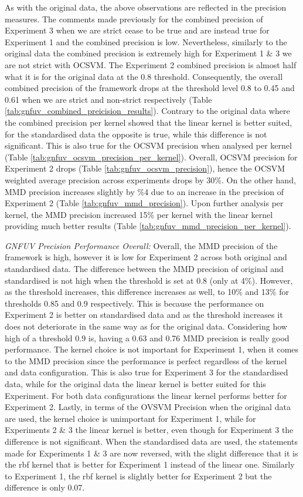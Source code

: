 \documentclass{mpaper}
\begin{document}
As with the original data, the above observations are reflected in the precision measures. The comments made previously for the combined precision of Experiment 3 when we are strict cease to be true and are instead true for Experiment 1 and the combined precision is low. Nevertheless, similarly to the original data the combined precision is extremely high for Experiment 1 \& 3 we are not strict with OCSVM. The Experiment 2 combined precision is almost half what it is for the original data at the 0.8 threshold. Consequently, the overall combined precision of the framework drops at the threshold level 0.8 to 0.45 and 0.61 when we are strict and non-strict respectively (Table \ref{tab:gnfuv_combined_preicision_results}). Contrary to the original data where the combined precision per kernel showed that the linear kernel is better suited, for the standardised data the opposite is true, while this difference is not significant. This is also true for the OCSVM precision when analysed per kernel (Table \ref{tab:gnfuv_ocsvm_precision_per_kernel}).  Overall, OCSVM precision for Experiment 2 drops (Table \ref{tab:gnfuv_ocsvm_precision}), hence the OCSVM weighted average precision across experiments drops by 30\%. On the other hand, MMD precision increases slightly by \%4 due to an increase in the precision of Experiment 2 (Table \ref{tab:gnfuv_mmd_precision}). Upon further analysis per kernel, the MMD precision increased 15\% per kernel with the linear kernel providing much better results (Table \ref{tab:gnfuv_mmd_precision_per_kernel}).

\textit{GNFUV Precision Performance Overall:} {} Overall, the MMD precision of the framework is high, however it is low for Experiment 2 across both original and standardised data. The difference between the MMD precision of original and standardised is not high when the threshold is set at 0.8 (only at 4\%). However, as the threshold increases, this difference increases as well, to 10\% and 13\% for thresholds 0.85 and 0.9 respectively. This is because the performance on Experiment 2 is better on standardised data and as the threshold increases it does not deteriorate in the same way as for the original data. Considering how high of a threshold 0.9 is, having a 0.63 and 0.76 MMD precision is really good performance. The kernel choice is not important for Experiment 1, when it comes to the MMD precision since the performance is perfect regardless of the kernel and data configuration. This is also true for Experiment 3 for the standardised data, while for the original data the linear kernel is better suited for this Experiment. For both data configurations the linear kernel performs better for Experiment 2. Lastly, in terms of the OVSVM Precision when the original data are used, the kernel choice is unimportant for Experiment 1, while for Experiments 2 \& 3 the linear kernel is better, even though for Experiment 3 the difference is not significant. When the standardised data are used, the statements made for Experiments 1 \& 3 are now reversed, with the slight difference that it is the rbf kernel that is better for Experiment 1 instead of the linear one. Similarly to Experiment 1, the rbf kernel is slightly better for Experiment 2 but the difference is only 0.07.
\end{document}
